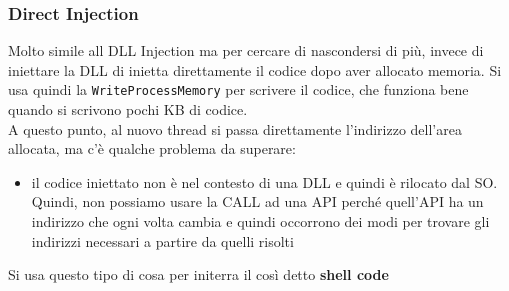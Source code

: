 \documentclass[12pt, oneside]{extbook}
\begin{document}
\subsubsection{Direct Injection}
Molto simile all DLL Injection ma per cercare di nascondersi di più, invece di iniettare la DLL di inietta direttamente il codice dopo aver allocato memoria. Si usa quindi la \texttt{WriteProcessMemory} per scrivere il codice, che funziona bene quando si scrivono pochi KB di codice.\\A questo punto, al nuovo thread si passa direttamente l'indirizzo dell'area allocata, ma c'è qualche problema da superare:
\begin{itemize}
	\item il codice iniettato non è nel contesto di una DLL e quindi è rilocato dal SO. Quindi, non possiamo usare la CALL ad una API perché quell'API ha un indirizzo che ogni volta cambia e quindi occorrono dei modi per trovare gli indirizzi necessari a partire da quelli risolti
\end{itemize}
Si usa questo tipo di cosa per initerra il così detto \textbf{shell code}
\end{document}
